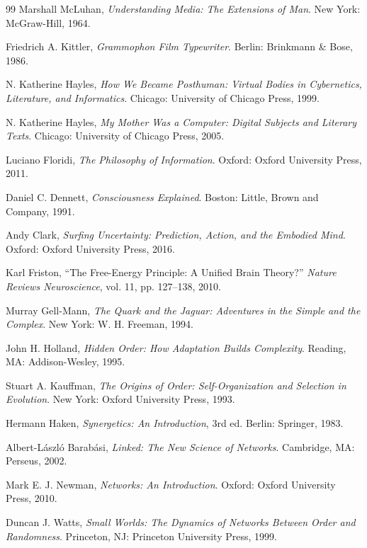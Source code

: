 \documentclass[11pt,oneside]{book}
\theoremstyle{definition}
\theoremstyle{remark}
\begin{document}
\begin{thebibliography}{99}
 Marshall McLuhan, \emph{Understanding Media: The Extensions of Man}. New York: McGraw-Hill,
  1964.

 Friedrich A. Kittler, \emph{Grammophon Film Typewriter}. Berlin: Brinkmann \& Bose, 1986.

 N. Katherine Hayles, \emph{How We Became Posthuman: Virtual Bodies in Cybernetics, Literature,
  and Informatics}. Chicago: University of Chicago Press, 1999.

 N. Katherine Hayles, \emph{My Mother Was a Computer: Digital Subjects and Literary Texts}.
  Chicago: University of Chicago Press, 2005.

 Luciano Floridi, \emph{The Philosophy of Information}. Oxford: Oxford University Press, 2011.

 Daniel C. Dennett, \emph{Consciousness Explained}. Boston: Little, Brown and Company, 1991.

 Andy Clark, \emph{Surfing Uncertainty: Prediction, Action, and the Embodied Mind}. Oxford:
  Oxford University Press, 2016.

 Karl Friston, ``The Free-Energy Principle: A Unified Brain Theory?'' \emph{Nature Reviews
  Neuroscience}, vol. 11, pp. 127--138, 2010.

 Murray Gell-Mann, \emph{The Quark and the Jaguar: Adventures in the Simple and the Complex}. New
  York: W. H. Freeman, 1994.

 John H. Holland, \emph{Hidden Order: How Adaptation Builds Complexity}. Reading, MA:
  Addison-Wesley, 1995.

 Stuart A. Kauffman, \emph{The Origins of Order: Self-Organization and Selection in Evolution}.
  New York: Oxford University Press, 1993.

 Hermann Haken, \emph{Synergetics: An Introduction}, 3rd ed. Berlin: Springer, 1983.

 Albert-L\'aszl\'o Barab\'asi, \emph{Linked: The New Science of Networks}. Cambridge, MA:
  Perseus, 2002.

 Mark E. J. Newman, \emph{Networks: An Introduction}. Oxford: Oxford University Press, 2010.

 Duncan J. Watts, \emph{Small Worlds: The Dynamics of Networks Between Order and Randomness}.
  Princeton, NJ: Princeton University Press, 1999.


\end{thebibliography}
\end{document}
